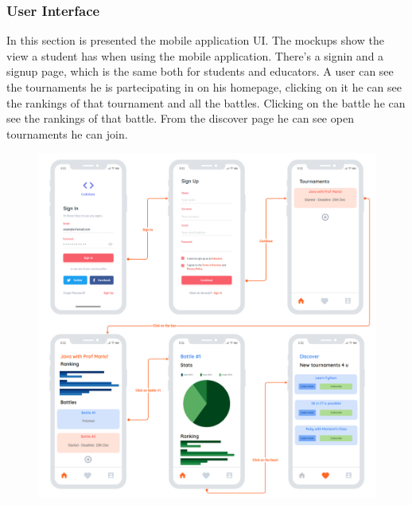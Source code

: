 \subsubsection{User Interface}
In this section is presented the mobile application UI. The mockups show the view a student has when using the mobile application. There's a signin and a signup page, which is the same both for students and educators. A user can see the tournaments he is partecipating in on his homepage, clicking on it he can see the rankings of that tournament and all the battles. Clicking on the battle he can see the rankings of that battle. From the discover page he can see open tournaments he can join.
\begin{figure}[h]
  \centering
  \includegraphics[width=0.8\linewidth]{3Specific_Requirements/res/MockupPhone.png}
\end{figure}